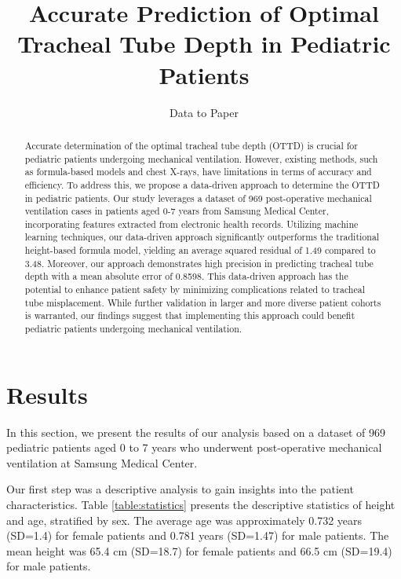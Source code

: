 \documentclass[11pt]{article}
\title{Accurate Prediction of Optimal Tracheal Tube Depth in Pediatric Patients}
\author{Data to Paper}
\begin{document}
\maketitle
\begin{abstract}
Accurate determination of the optimal tracheal tube depth (OTTD) is crucial for pediatric patients undergoing mechanical ventilation. However, existing methods, such as formula-based models and chest X-rays, have limitations in terms of accuracy and efficiency. To address this, we propose a data-driven approach to determine the OTTD in pediatric patients. Our study leverages a dataset of 969 post-operative mechanical ventilation cases in patients aged 0-7 years from Samsung Medical Center, incorporating features extracted from electronic health records. Utilizing machine learning techniques, our data-driven approach significantly outperforms the traditional height-based formula model, yielding an average squared residual of 1.49 compared to 3.48. Moreover, our approach demonstrates high precision in predicting tracheal tube depth with a mean absolute error of 0.8598. This data-driven approach has the potential to enhance patient safety by minimizing complications related to tracheal tube misplacement. While further validation in larger and more diverse patient cohorts is warranted, our findings suggest that implementing this approach could benefit pediatric patients undergoing mechanical ventilation.
\end{abstract}
\section*{Results}

In this section, we present the results of our analysis based on a dataset of 969 pediatric patients aged 0 to 7 years who underwent post-operative mechanical ventilation at Samsung Medical Center. 

Our first step was a descriptive analysis to gain insights into the patient characteristics. Table {}\ref{table:statistics} presents the descriptive statistics of height and age, stratified by sex. The average age was approximately 0.732 years (SD=1.4) for female patients and 0.781 years (SD=1.47) for male patients. The mean height was 65.4 cm (SD=18.7) for female patients and 66.5 cm (SD=19.4) for male patients. 
\end{document}
